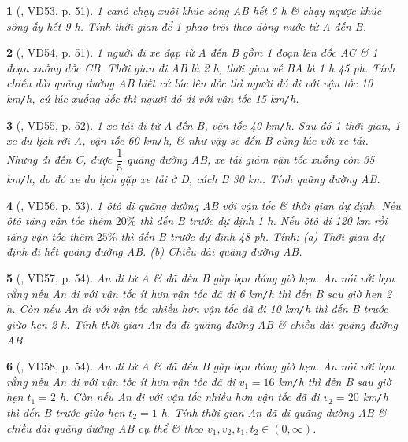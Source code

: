\documentclass{article}
\newtheorem{baitoan}{}
\begin{document}
\begin{baitoan}[\cite{Binh_Toan_6_tap_2}, VD53, p. 51]
	1 canô chạy xuôi khúc sông AB hết {\rm6 h} \& chạy ngược khúc sông ấy hết {\rm9 h}. Tính thời gian để 1 phao trôi theo dòng nước từ A đến B.
\end{baitoan}

\begin{baitoan}[\cite{Binh_Toan_6_tap_2}, VD54, p. 51]
	1 người đi xe đạp từ A đến B gồm 1 đoạn lên dốc AC \& 1 đoạn xuống dốc CB. Thời gian đi AB là {\rm2 h}, thời gian về BA là {\rm1 h 45 ph}. Tính chiều dài quãng đường AB biết cứ lúc lên dốc thì người đó đi với vận tốc {\rm10 km{\tt/}h}, cứ lúc xuống dốc thì người đó đi với vận tốc {\rm15 km{\tt/}h}.
\end{baitoan}

\begin{baitoan}[\cite{Binh_Toan_6_tap_2}, VD55, p. 52]
	1 xe tải đi từ A đến B, vận tốc {\rm40 km{\tt/}h}. Sau đó 1 thời gian, 1 xe du lịch rời A, vận tốc {\rm60 km{\tt/}h}, \& như vậy sẽ đến B cùng lúc với xe tải. Nhưng đi đến C, được $\dfrac{1}{5}$ quãng đường AB, xe tải giảm vận tốc xuống còn {\rm35 km{\tt/}h}, do đó xe du lịch gặp xe tải ở D, cách B {\rm30 km}. Tính quãng đường AB.
\end{baitoan}

\begin{baitoan}[\cite{Binh_Toan_6_tap_2}, VD56, p. 53]
	1 ôtô đi quãng đường AB với vận tốc \& thời gian dự định. Nếu ôtô tăng vận tốc thêm $20\%$ thì đến B trước dự định {\rm1 h}. Nếu ôtô đi {\rm120 km} rồi tăng vận tốc thêm $25\%$ thì đến B trước dự định {\rm48 ph}. Tính: (a) Thời gian dự định đi hết quãng đường AB. (b) Chiều dài quãng đường AB.
\end{baitoan}

\begin{baitoan}[\cite{Binh_Toan_6_tap_2}, VD57, p. 54]
	An đi từ A \& đã đến B gặp bạn đúng giờ hẹn. An nói với bạn rằng nếu An đi với vận tốc ít hơn vận tốc đã đi {\rm6 km{\tt/}h} thì đến B sau giờ hẹn {\rm2 h}. Còn nếu An đi với vận tốc nhiều hơn vận tốc đã đi {\rm10 km{\tt/}h} thì đến B trước giừo hẹn {\rm2 h}. Tính thời gian An đã đi quãng đường AB \& chiều dài quãng đường AB.
\end{baitoan}

\begin{baitoan}[\cite{Binh_Toan_6_tap_2}, VD58, p. 54]
	An đi từ A \& đã đến B gặp bạn đúng giờ hẹn. An nói với bạn rằng nếu An đi với vận tốc ít hơn vận tốc đã đi $v_1 = 16$ {\rm km{\tt/}h} thì đến B sau giờ hẹn $t_1 = 2$ {\rm h}. Còn nếu An đi với vận tốc nhiều hơn vận tốc đã đi $v_2 = 20$ {\rm km{\tt/}h} thì đến B trước giừo hẹn $t_2 = 1$ {\rm h}. Tính thời gian An đã đi quãng đường AB \& chiều dài quãng đường AB cụ thể \& theo $v_1,v_2,t_1,t_2\in(0,\infty)$.
\end{baitoan}
\end{document}
